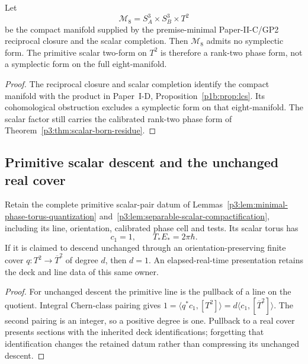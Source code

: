 \documentclass[12pt,a4paper]{article}
\begin{document}
\begin{theorem}
\label{p3:thm:full-compact-carrier-no-symplectic-a}
Let
\[
 \mathcal M_8=S^3_A\times S^3_B\times T^2
\]
be the compact manifold supplied by the premise-minimal Paper-II-C/GP2
reciprocal closure and the scalar completion.  Then
\(\mathcal M_8\) admits no symplectic form.  The primitive scalar two-form on
\(T^2\) is therefore a rank-two phase form, not a symplectic form on the full
eight-manifold.
\end{theorem}

\begin{proof}
The reciprocal closure and scalar completion identify the compact
manifold with the product in Paper~I-D,
Proposition~\ref{p1b:prop:lcs}. Its cohomological obstruction excludes a
symplectic form on that eight-manifold. The scalar factor still carries
the calibrated rank-two phase form of
Theorem~\ref{p3:thm:scalar-born-residue}.
\end{proof}

\subsection{Primitive scalar descent and the unchanged real cover}
\label{p3a:sec:scalar-cover-faithfulness}

\begin{corollary}
\label{p3a:cor:primitive-scalar-unchanged-descent}
Retain the complete primitive scalar-pair datum of
Lemmas~\ref{p3:lem:minimal-phase-torus-quantization}
and~\ref{p3:lem:separable-scalar-compactification}, including its line,
orientation, calibrated phase cell and tests. Its scalar torus has
\[
 c_1=1,\qquad T_*E_*=2\pi\hbar.
\]
If it is claimed to descend unchanged through an orientation-preserving
finite cover \(q:T^2\to\overline T^2\) of degree \(d\), then \(d=1\).
An elapsed-real-time presentation retains the deck and line data of this
same owner.
\end{corollary}
\begin{proof}
For unchanged descent the primitive line is the pullback of a line on the
quotient. Integral Chern-class pairing gives
\(1=\langle q^*c_1,[T^2]\rangle
=d\langle c_1,[\overline T^2]\rangle\).
The second pairing is an integer, so a positive degree is one. Pullback to
a real cover presents sections with the inherited deck identifications;
forgetting that identification changes the retained datum rather than
compressing its unchanged descent.
\end{proof}
\end{document}
